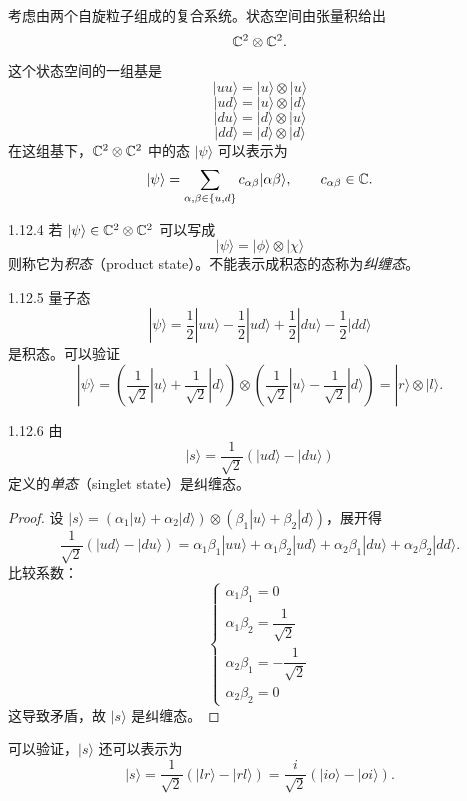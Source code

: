 考虑由两个自旋粒子组成的复合系统。状态空间由张量积给出
\[
  \mathbb{C}^2\otimes\mathbb{C}^2.
\]
这个状态空间的一组基是
\[
  |uu\rangle=|u\rangle\otimes|u\rangle
\]
\[
  |ud\rangle=|u\rangle\otimes|d\rangle
\]
\[
  |du\rangle=|d\rangle\otimes|u\rangle
\]
\[
  |dd\rangle=|d\rangle\otimes|d\rangle
\]
在这组基下，\(\mathbb{C}^2\otimes\mathbb{C}^2\) 中的态 \(|\psi\rangle\) 可以表示为
\[
  |\psi\rangle=\sum_{\alpha,\beta\in\{u,d\}}c_{\alpha\beta}|\alpha\beta\rangle,
  \qquad c_{\alpha\beta}\in\mathbb{C}.
\]

\begin{definition}{1.12.4}
若 \(|\psi\rangle\in\mathbb{C}^2\otimes\mathbb{C}^2\) 可以写成
\[
  |\psi\rangle=|\phi\rangle\otimes|\chi\rangle
\]
则称它为\emph{积态}（product state）。不能表示成积态的态称为\emph{纠缠态}。
\end{definition}

\begin{example}{1.12.5}
量子态
\[
  |\psi\rangle=\frac{1}{2}|uu\rangle-\frac{1}{2}|ud\rangle
  +\frac{1}{2}|du\rangle-\frac{1}{2}|dd\rangle
\]
是积态。可以验证
\[
  |\psi\rangle=\left(\frac{1}{\sqrt2}|u\rangle+\frac{1}{\sqrt2}|d\rangle\right)
  \otimes\left(\frac{1}{\sqrt2}|u\rangle-\frac{1}{\sqrt2}|d\rangle\right)
  =|r\rangle\otimes|l\rangle.
\]
\end{example}

\begin{example}{1.12.6}
由
\[
  |s\rangle=\frac{1}{\sqrt2}\left(|ud\rangle-|du\rangle\right)
\]
定义的\emph{单态}（singlet state）是纠缠态。
\end{example}

\begin{proof}
设 \(|s\rangle=(\alpha_1|u\rangle+\alpha_2|d\rangle)\otimes(\beta_1|u\rangle+\beta_2|d\rangle)\)，展开得
\[
  \frac{1}{\sqrt2}\left(|ud\rangle-|du\rangle\right)
  =\alpha_1\beta_1|uu\rangle+\alpha_1\beta_2|ud\rangle
  +\alpha_2\beta_1|du\rangle+\alpha_2\beta_2|dd\rangle.
\]
比较系数：
\[
  \begin{cases}
    \alpha_1\beta_1=0\\[2pt]
    \alpha_1\beta_2=\dfrac{1}{\sqrt2}\\[6pt]
    \alpha_2\beta_1=-\dfrac{1}{\sqrt2}\\[6pt]
    \alpha_2\beta_2=0
  \end{cases}
\]
这导致矛盾，故 \(|s\rangle\) 是纠缠态。
\end{proof}

可以验证，\(|s\rangle\) 还可以表示为
\[
  |s\rangle=\frac{1}{\sqrt2}\left(|lr\rangle-|rl\rangle\right)
  =\frac{i}{\sqrt2}\left(|io\rangle-|oi\rangle\right).
\]

